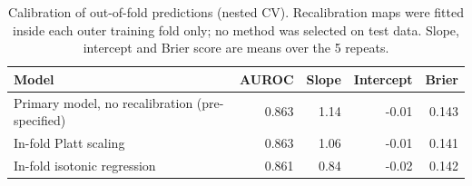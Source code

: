 \begin{table}[htbp]\centering\small
\caption{Calibration of out-of-fold predictions (nested CV). Recalibration maps were fitted inside each outer training fold only; no method was selected on test data. Slope, intercept and Brier score are means over the 5 repeats.}\label{tab:recal}
\begin{tabular}{>{\raggedright\arraybackslash}p{5.6cm}rrrr}
\toprule
Model & AUROC & Slope & Intercept & Brier \\
\midrule
Primary model, no recalibration (pre-specified) & 0.863 & 1.14 & -0.01 & 0.143 \\
In-fold Platt scaling & 0.863 & 1.06 & -0.01 & 0.141 \\
In-fold isotonic regression & 0.861 & 0.84 & -0.02 & 0.142 \\
\bottomrule
\end{tabular}
\end{table}
